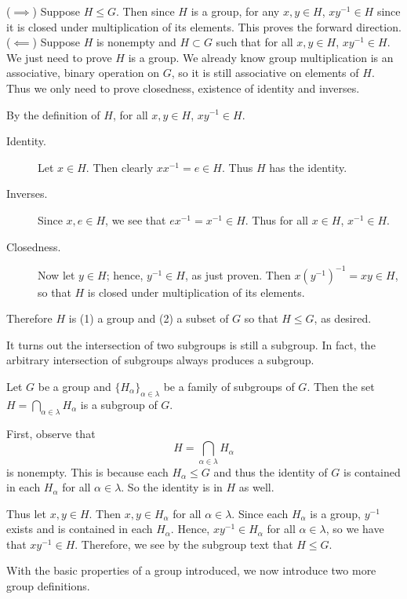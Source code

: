     \begin{prf}

        ($\implies$) Suppose $H \le G$. Then since $H$ is a group,
        for any $x, y \in H$, $xy^{-1} \in H$ since it is closed under
        multiplication of its elements. This proves the forward
        direction.
        \\
        
        ($\impliedby$) Suppose $H$ is nonempty and $H \subset G$ such
        that for all $x, y \in H$, $xy^{-1} \in H$. We just need to
        prove $H$ is a group. We already know group multiplication is
        an associative, binary operation on $G$, so it is still
        associative on elements of $H$. Thus we only need to prove
        closedness, existence of identity and inverses.
        
        By the definition of $H$, for all $x, y \in H$, $xy^{-1} \in
        H$. 
        \begin{description}
            \item[Identity.] Let $x \in H$. Then clearly $xx^{-1} = e \in H$. Thus $H$
            has the identity.
            \item[Inverses.] Since $x, e \in H$, we see that $ex^{-1} =
            x^{-1} \in H$. Thus for all $x \in H$, $x^{-1} \in H$.
            \item[Closedness.] Now let $y \in H$; hence, $y^{-1} \in H$, as just proven. Then
            $x(y^{-1})^{-1} = xy\in H$, so that $H$ is closed under
            multiplication of its elements.
        \end{description} 
        Therefore $H$ is (1) a group
        and (2) a subset of $G$ so that $H \le G$, as desired.
    \end{prf}

    It turns out the intersection of two subgroups is still a
    subgroup. In fact, the arbitrary intersection of subgroups always
    produces a subgroup. 
    \begin{thm}
        Let $G$ be a group and $\{H_\alpha\}_{\alpha \in \lambda}$ be
        a family of subgroups of $G$. Then the set $H =
        \bigcap_{\alpha \in \lambda} H_\alpha$ is a subgroup of $G$.
    \end{thm}

    \begin{prf}
        First, observe that 
        \[
            H = \bigcap_{\alpha \in \lambda} H_\alpha
        \]
        is nonempty. This is because each $H_\alpha \le G$ and thus
       the identity of $G$ is contained in each $H_\alpha$ for all
       $\alpha \in \lambda$. So the identity is in $H$ as well.

       Thus let $x, y \in H$. Then $x, y \in H_\alpha$ for all $\alpha
       \in \lambda$. Since each $H_\alpha$ is a group, $y^{-1}$ exists
       and is contained in each $H_\alpha$. Hence, $xy^{-1} \in
       H_\alpha$ for all $\alpha \in \lambda$, so we have that
       $xy^{-1} \in H$. Therefore, we see by the subgroup text that $H
       \le G$. 
    \end{prf}
    With the basic properties of a group introduced, we now introduce
    two more group definitions. 

